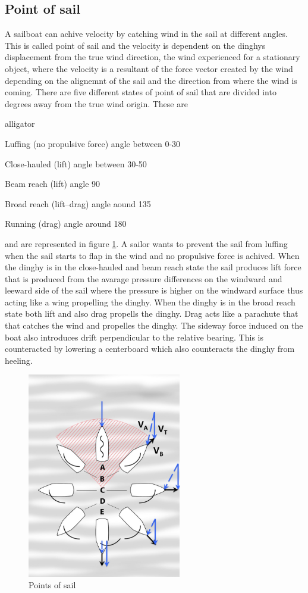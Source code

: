 \subsection{Point of sail}
A sailboat can achive velocity by catching wind in the sail at different angles. This is called point of sail and the velocity is dependent on the dinghys displacement from the true wind direction, the wind experienced for a stationary object, where the velocity is a resultant of the force vector created by the wind depending on the alignemnt of the sail and the direction from where the wind is coming. There are five different states of point of sail that are divided into degrees away from the true wind origin. These are
\begin{labeling}{alligator}
\item [Luffing] (no propulsive force) angle between 0-30\degree
\item [Close-hauled] (lift) angle between 30-50\degree
\item [Beam reach] (lift) angle 90\degree
\item [Broad reach] (lift–drag) angle aound 135\degree
\item [Running] (drag) angle around 180\degree
\end{labeling}
and are represented in figure \ref{points-sail}. A sailor wants to prevent the sail from luffing when the sail starts to flap in the wind and no propulsive force is achived. When the dinghy is in the close-hauled and beam reach state the sail produces lift force that is produced from the avarage pressure differences on the windward and leeward side of the sail where the pressure is higher on the windward surface thus acting like a wing propelling the dinghy. When the dinghy is in the broad reach state both lift and also drag propells the dinghy. Drag acts like a parachute that that catches the wind and propelles the dinghy. The sideway force induced on the boat also introduces drift perpendicular to the relative bearing. This is counteracted by lowering a centerboard which also counteracts the dinghy from heeling.
\begin{figure}[H]
\centering
\includegraphics[width=0.6\textwidth]{Figures/Points_of_sail.jpg}
\caption{Points of sail}
\label{points-sail}
\end{figure}
